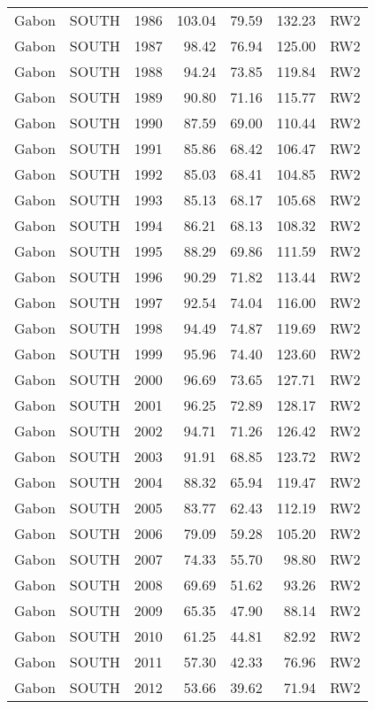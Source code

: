 \begin{longtable}{lllrrrl}
  Gabon & SOUTH & 1986 & 103.04 & 79.59 & 132.23 & RW2 \\ 
  Gabon & SOUTH & 1987 & 98.42 & 76.94 & 125.00 & RW2 \\ 
  Gabon & SOUTH & 1988 & 94.24 & 73.85 & 119.84 & RW2 \\ 
  Gabon & SOUTH & 1989 & 90.80 & 71.16 & 115.77 & RW2 \\ 
  Gabon & SOUTH & 1990 & 87.59 & 69.00 & 110.44 & RW2 \\ 
  Gabon & SOUTH & 1991 & 85.86 & 68.42 & 106.47 & RW2 \\ 
  Gabon & SOUTH & 1992 & 85.03 & 68.41 & 104.85 & RW2 \\ 
  Gabon & SOUTH & 1993 & 85.13 & 68.17 & 105.68 & RW2 \\ 
  Gabon & SOUTH & 1994 & 86.21 & 68.13 & 108.32 & RW2 \\ 
  Gabon & SOUTH & 1995 & 88.29 & 69.86 & 111.59 & RW2 \\ 
  Gabon & SOUTH & 1996 & 90.29 & 71.82 & 113.44 & RW2 \\ 
  Gabon & SOUTH & 1997 & 92.54 & 74.04 & 116.00 & RW2 \\ 
  Gabon & SOUTH & 1998 & 94.49 & 74.87 & 119.69 & RW2 \\ 
  Gabon & SOUTH & 1999 & 95.96 & 74.40 & 123.60 & RW2 \\ 
  Gabon & SOUTH & 2000 & 96.69 & 73.65 & 127.71 & RW2 \\ 
  Gabon & SOUTH & 2001 & 96.25 & 72.89 & 128.17 & RW2 \\ 
  Gabon & SOUTH & 2002 & 94.71 & 71.26 & 126.42 & RW2 \\ 
  Gabon & SOUTH & 2003 & 91.91 & 68.85 & 123.72 & RW2 \\ 
  Gabon & SOUTH & 2004 & 88.32 & 65.94 & 119.47 & RW2 \\ 
  Gabon & SOUTH & 2005 & 83.77 & 62.43 & 112.19 & RW2 \\ 
  Gabon & SOUTH & 2006 & 79.09 & 59.28 & 105.20 & RW2 \\ 
  Gabon & SOUTH & 2007 & 74.33 & 55.70 & 98.80 & RW2 \\ 
  Gabon & SOUTH & 2008 & 69.69 & 51.62 & 93.26 & RW2 \\ 
  Gabon & SOUTH & 2009 & 65.35 & 47.90 & 88.14 & RW2 \\ 
  Gabon & SOUTH & 2010 & 61.25 & 44.81 & 82.92 & RW2 \\ 
  Gabon & SOUTH & 2011 & 57.30 & 42.33 & 76.96 & RW2 \\ 
  Gabon & SOUTH & 2012 & 53.66 & 39.62 & 71.94 & RW2 \\ 

\end{longtable}
